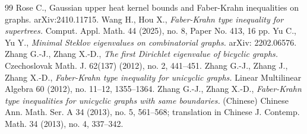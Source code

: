 \documentclass[12pt]{amsart}
\theoremstyle{definition}
\theoremstyle{remark}
\numberwithin{equation}{section}
\begin{document}
\begin{thebibliography}{99}
Rose C., {Gaussian upper heat kernel bounds and Faber-Krahn inequalities
on graphs.} arXiv:2410.11715.
Wang H., Hou X., {\sl Faber-Krahn type inequality for supertrees.} Comput. Appl. Math. 44 (2025), no. 8, Paper No. 413, 16 pp.
Yu C., Yu Y., {\sl Minimal Steklov eigenvalues on combinatorial graphs.} arXiv: 2202.06576.
Zhang G.-J., Zhang X.-D., {\sl The first Dirichlet eigenvalue of bicyclic graphs.} Czechoslovak Math. J. 62(137) (2012), no. 2, 441--451.
Zhang G.-J., Zhang J., Zhang X.-D., {\sl Faber-Krahn type inequality for unicyclic graphs.} Linear Multilinear Algebra 60 (2012), no. 11--12, 1355--1364.
Zhang G.-J., Zhang X.-D., {\sl Faber-Krahn type inequalities for unicyclic graphs with same boundaries.} (Chinese) Chinese Ann. Math. Ser. A 34 (2013), no. 5, 561--568; translation in Chinese J. Contemp. Math. 34 (2013), no. 4, 337--342.
\end{thebibliography}
\end{document}
